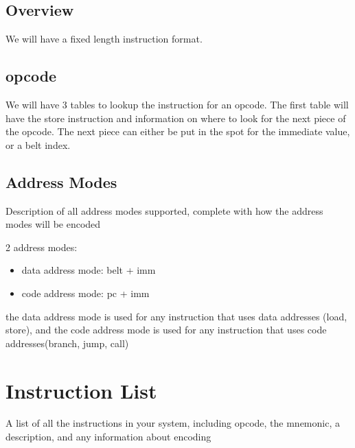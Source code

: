 \documentclass{article}
\begin{document}




	\subsection{Overview}
		We will have a fixed length instruction format.

	\subsection{opcode}
		We will have 3 tables to lookup the instruction for an opcode.
		The first table will have the store instruction and information on where to look for the next piece of the opcode.
		The next piece can either be put in the spot for the immediate value, or a belt index.


	\subsection{Address Modes}
		Description of all address modes supported, complete with how the address modes will be encoded

		2 address modes:
		\begin{itemize}
			\item data address mode: belt + imm
			\item code address mode: pc + imm
		\end{itemize}
		the data address mode is used for any instruction that uses data addresses (load, store), and the code address mode is used for any instruction that uses code addresses(branch, jump, call)

\clearpage
\section{Instruction List}
	A list of all the instructions in your system, including opcode, the mnemonic, a description, and any information about encoding
\end{document}
